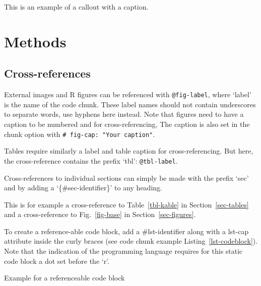 \documentclass[
  letterpaper,
  DIV=11,
  numbers=noendperiod]{scrartcl}
\begin{document}
\begin{tcolorbox}[enhanced jigsaw, toprule=.15mm, colbacktitle=quarto-callout-tip-color!10!white, colback=white, rightrule=.15mm, left=2mm, title=\textcolor{quarto-callout-tip-color}{\faLightbulb}\hspace{0.5em}{Tip With Caption}, colframe=quarto-callout-tip-color-frame, breakable, bottomtitle=1mm, opacitybacktitle=0.6, opacityback=0, bottomrule=.15mm, arc=.35mm, coltitle=black, leftrule=.75mm, toptitle=1mm, titlerule=0mm]

This is an example of a callout with a caption.

\end{tcolorbox}

\section{Methods}\label{methods}

\subsection{Cross-references}\label{cross-references}

External images and R figures can be referenced with
\texttt{@fig-label}, where `label' is the name of the code chunk. These
label names should not contain underscores to separate words, use
hyphens here instead. Note that figures need to have a caption to be
numbered and for cross-referencing, The caption is also set in the chunk
option with \texttt{\#\textbar{}\ fig-cap:\ "Your\ caption"}.

Tables require similarly a label and table caption for
cross-referencing. But here, the cross-reference contains the prefix
`tbl': \texttt{@tbl-label}.

Cross-references to individual sections can simply be made with the
prefix `sec' and by adding a `\{\#sec-identifier\}' to any heading.

This is for example a cross-reference to Table~\ref{tbl-kable} in
Section~\ref{sec-tables} and a cross-reference to Fig.~\ref{fig-base} in
Section~\ref{sec-figures}.

To create a reference-able code block, add a \#lst-identifier along with
a lst-cap attribute inside the curly braces (see code chunk example
Listing~\ref{lst-codeblock}). Note that the indication of the
programming language requires for this static code block a dot set
before the `r'.

\begin{codelisting}

\caption{\label{lst-codeblock}Example for a referenceable code block}


\end{codelisting}%
\end{document}
